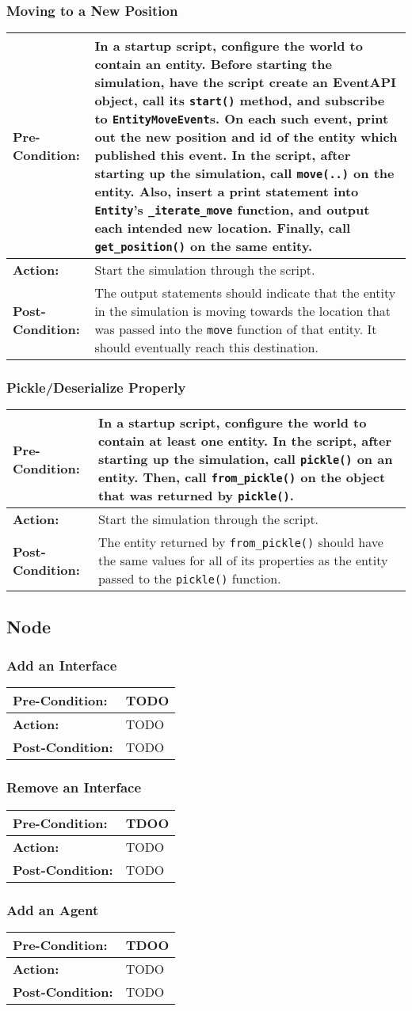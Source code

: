 \documentclass[titlepage]{article}
\newcommand{\testcase}[3]{
    \begin{center}
    \begin{tabular}{| l | p{0.7\textwidth}|}
        \hline
        \rowcolor[gray]{0.8}\textbf{Pre-Condition:} & #1 \\ \hline
        \textbf{Action:} & #2 \\ \hline
        \rowcolor[gray]{0.8}\textbf{Post-Condition:} & #3 \\ \hline
    \end{tabular}
    \end{center}
}
\begin{document}
\subsubsection{Moving to a New Position}
\testcase{In a startup script, configure the world to contain an entity. Before starting the simulation, have the script create an EventAPI object, call its \texttt{start()} method, and subscribe to \texttt{EntityMoveEvent}s. On each such event, print out the new position and id of the entity which published this event. In the script, after starting up the simulation, call \texttt{move(..)} on the entity. Also, insert a print statement into \texttt{Entity}'s \texttt{\_iterate\_move} function, and output each intended new location. Finally, call \texttt{get\_position()} on the same entity.}{Start the simulation through the script.}{The output statements should indicate that the entity in the simulation is moving towards the location that was passed into the \texttt{move} function of that entity.  It should eventually reach this destination.}

\subsubsection{Pickle/Deserialize Properly}
\testcase{In a startup script, configure the world to contain at least one entity. In the script, after starting up the simulation, call \texttt{pickle()} on an entity. Then, call \texttt{from\_pickle()} on the object that was returned by \texttt{pickle()}.}{Start the simulation through the script.}{The entity returned by \texttt{from\_pickle()} should have the same values for all of its properties as the entity passed to the \texttt{pickle()} function.}

\subsection{Node}
\subsubsection{Add an Interface}
\testcase{TODO}{TODO}{TODO}

\subsubsection{Remove an Interface}
\testcase{TDOO}{TODO}{TODO}

\subsubsection{Add an Agent}
\testcase{TDOO}{TODO}{TODO}
\end{document}
